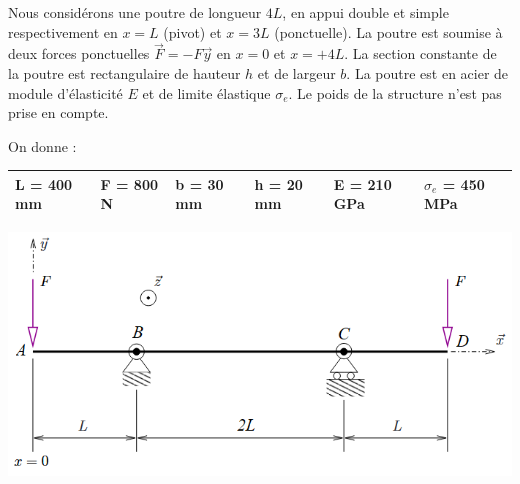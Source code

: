 \documentclass[lecture.tex]{subfiles}
\begin{document}
\exercice{}

Nous considérons une poutre de longueur $4L$, en appui double et simple respectivement en $x=L$ (pivot) et $x=3L$ (ponctuelle). La poutre est soumise à deux forces ponctuelles $\vec{F}=-F \vec{y}$ en $x=0$ et $x=+4 L$. La section constante de la poutre est rectangulaire de hauteur $h$ et de largeur $b$. La poutre est en acier de module d'élasticité $E$ et de limite élastique $\sigma_{e}$. Le poids de la structure n'est pas prise en compte.

\medskip

On donne :

\begin{center}
  \begin{tabular}{|l|l|l|l|l|l|}
    \hline
    L = 400 mm & F = 800 N & b = 30 mm & h = 20 mm & E = 210 GPa & $\sigma_{e}$ = 450 MPa \\
    \hline
  \end{tabular}
\end{center}

\medskip

\begin{center}
  \includegraphics[scale=0.6]{figA0022.png}
\end{center}

\medskip
\end{document}
